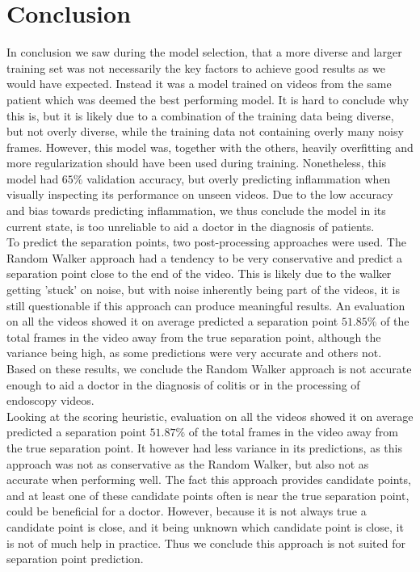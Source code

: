 \section{Conclusion}
In conclusion we saw during the model selection, that a more diverse and larger training set was not necessarily the key factors to achieve good results as we would have expected. Instead it was a model trained on videos from the same patient which was deemed the best performing model. It is hard to conclude why this is, but it is likely due to a combination of the training data being diverse, but not overly diverse, while the training data not containing overly many noisy frames. However, this model was, together with the others, heavily overfitting and more regularization should have been used during training. Nonetheless, this model had $65\%$ validation accuracy, but overly predicting inflammation when visually inspecting its performance on unseen videos. Due to the low accuracy and bias towards predicting inflammation, we thus conclude the model in its current state, is too unreliable to aid a doctor in the diagnosis of patients.\\
To predict the separation points, two post-processing approaches were used. The Random Walker approach had a tendency to be very conservative and predict a separation point close to the end of the video. This is likely due to the walker getting 'stuck' on noise, but with noise inherently being part of the videos, it is still questionable if this approach can produce meaningful results. An evaluation on all the videos showed it on average predicted a separation point $51.85\%$ of the total frames in the video away from the true separation point, although the variance being high, as some predictions were very accurate and others not. Based on these results, we conclude the Random Walker approach is not accurate enough to aid a doctor in the diagnosis of colitis or in the processing of endoscopy videos.\\
Looking at the scoring heuristic, evaluation on all the videos showed it on average predicted a separation point $51.87\%$ of the total frames in the video away from the true separation point. It however had less variance in its predictions, as this approach was not as conservative as the Random Walker, but also not as accurate when performing well. The fact this approach provides candidate points, and at least one of these candidate points often is near the true separation point, could be beneficial for a doctor. However, because it is not always true a candidate point is close, and it being unknown which candidate point is close, it is not of much help in practice. Thus we conclude this approach is not suited for separation point prediction.\\
